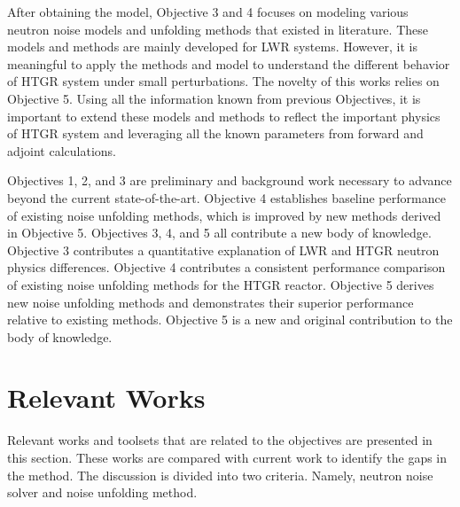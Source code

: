 After obtaining the model, Objective 3 and 4 focuses on modeling various neutron noise models and unfolding methods that existed in literature. These models and methods are mainly developed for LWR systems. However, it is meaningful to apply the methods and model to understand the different behavior of HTGR system under small perturbations. The novelty of this works relies on Objective 5. Using all the information known from previous Objectives, it is important to extend these models and methods to reflect the important physics of HTGR system and leveraging all the known parameters from forward and adjoint calculations.

Objectives 1, 2, and 3 are preliminary and background work necessary to advance beyond the current state-of-the-art. Objective 4 establishes baseline performance of existing noise unfolding methods, which is improved by new methods derived in Objective 5. Objectives 3, 4, and 5 all contribute a new body of knowledge. Objective 3 contributes a quantitative explanation of LWR and HTGR neutron physics differences. Objective 4 contributes a consistent performance comparison of existing noise unfolding methods for the HTGR reactor. Objective 5 derives new noise unfolding methods and demonstrates their superior performance relative to existing methods. Objective 5 is a new and original contribution to the body of knowledge.

\section{Relevant Works}

Relevant works and toolsets that are related to the objectives are presented in this section. These works are compared with current work to identify the gaps in the method. The discussion is divided into two criteria. Namely, neutron noise solver and noise unfolding method.

